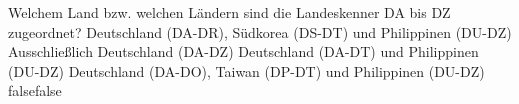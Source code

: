     {Welchem Land bzw. welchen Ländern sind die Landeskenner DA bis DZ zugeordnet?}
    {Deutschland (DA-DR), Südkorea (DS-DT) und Philippinen (DU-DZ)}
    {Ausschließlich Deutschland (DA-DZ)}
    {Deutschland (DA-DT) und Philippinen (DU-DZ)}
    {Deutschland (DA-DO), Taiwan (DP-DT) und Philippinen (DU-DZ)}
    {false}{false}